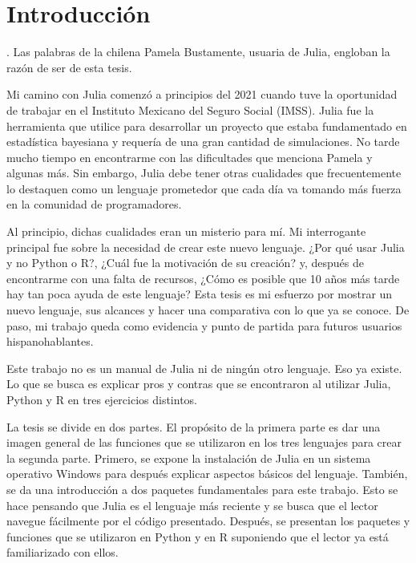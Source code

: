 \chapter{Introducción}

 \cite{articulo_10anos}. Las palabras de la chilena Pamela Bustamente, usuaria de \textsf{Julia},  engloban la razón de ser de esta tesis. 

Mi camino con \textsf{Julia} comenzó a principios del 2021 cuando tuve la oportunidad de trabajar en el Instituto Mexicano del Seguro Social (IMSS). \textsf{Julia} fue la herramienta que utilice para desarrollar un proyecto que estaba fundamentado en estadística bayesiana y requería de una gran cantidad de simulaciones. No tarde mucho tiempo en encontrarme con las dificultades que menciona Pamela y algunas más. Sin embargo, \textsf{Julia} debe tener otras cualidades que frecuentemente lo destaquen como un lenguaje prometedor que cada día va tomando más fuerza en la comunidad de programadores. 

Al principio, dichas cualidades eran un misterio para mí. Mi interrogante principal fue sobre la necesidad de crear este nuevo lenguaje. ¿Por qué usar \textsf{Julia} y no \textsf{Python} o \textsf{R}?, ¿Cuál fue la motivación de su creación? y, después de encontrarme con una falta de recursos, ¿Cómo es posible que 10 años más tarde hay tan poca ayuda de este lenguaje?  Esta tesis es mi esfuerzo por mostrar un nuevo lenguaje, sus alcances y hacer una comparativa con lo que ya se conoce. De paso, mi trabajo queda como evidencia y punto de partida para futuros usuarios hispanohablantes.  

Este trabajo no es un manual de \textsf{Julia} ni de ningún otro lenguaje. Eso ya existe. Lo que se busca es explicar pros y contras que se encontraron al utilizar \textsf{Julia}, \textsf{Python} y \textsf{R} en tres ejercicios distintos.

La tesis se divide en dos partes. El propósito de la primera parte es dar una imagen general de las funciones que se utilizaron en los tres lenguajes para crear la segunda parte. Primero, se expone la instalación de \textsf{Julia} en un sistema operativo \textsf{Windows} para después explicar aspectos básicos del lenguaje. También, se da una introducción a dos paquetes fundamentales para este trabajo. Esto se hace pensando que \textsf{Julia} es el lenguaje más reciente y se busca que el lector navegue fácilmente por el código presentado. Después, se presentan los paquetes y funciones que se utilizaron en \textsf{Python} y en \textsf{R} suponiendo que el lector ya está familiarizado con ellos. 


